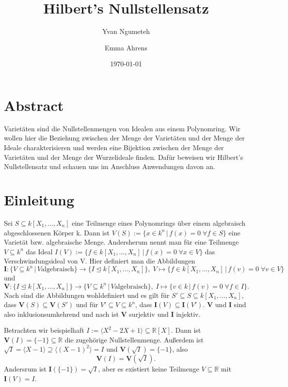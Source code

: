 \documentclass{article}
\title{Hilbert's Nullstellensatz}
\date{\today}
\author{Yvan Ngumeteh \and Emma Ahrens}
\newcommand*{\R}{k[X_{1},\ldots,X_{n}]}
\begin{document}
\maketitle

\section{Abstract}

	Varietäten sind die Nullstellenmengen von Idealen aus einem Polynomring. Wir wollen hier die Beziehung zwischen der Menge der Varietäten und der Menge der Ideale charakterisieren und werden
	eine Bijektion zwischen der Menge der Varietäten und der Menge der Wurzelideale finden. 
	Dafür beweisen wir Hilbert's Nullstellensatz und schauen uns im Anschluss Anwendungen davon an.

\section{Einleitung}

	Sei \(S \subseteq \R\) eine Teilmenge eines Polynomrings über einem algebraisch abgeschlossenen
	Körper k. Dann ist \(V(S) := \{x \in k^n\,|\, f(x)=0\; \forall f \in S\}\) eine Varietät bzw.
	algebraische Menge. Andersherum nennt man für eine Teilmenge \(V \subseteq k^{n}\) das 
	Ideal \(I(V) := \{f \in \R\,|\, f(x)=0\; \forall x\in V\}\) das Verschwindungsideal von V.
	Hier definiert man die Abbildungen
	\begin{displaymath} \mathbf{I}: \{ V \subseteq k^n\,|\, V \text{algebraisch}\} \rightarrow \{ I \unlhd k[X_1, \ldots, X_n]\},\; V \mapsto \{f \in k[X_1, \ldots, X_n]\,|\, f(v) = 0 \; \forall v \in V\} \end{displaymath}
	und \begin{displaymath} \mathbf{V}: \{ I \unlhd k[X_1, \ldots, X_n]\} \rightarrow \{ V \subseteq k^n\,|\, V \text{algebraisch}\},\; I \mapsto \{v \in k\,|\, f(v) = 0 \; \forall f \in I\}. \end{displaymath}
	Nach \cite{Geck} sind die Abbildungen wohldefiniert und es gilt für \(S' \subseteq S \subseteq k[X_1,\ldots,X_n]\), dass \(\mathbf{V}(S) \subseteq \mathbf{V}(S')\) und für \(V' \subseteq V \subseteq k^n\), dass \(\mathbf{I}(V) \subseteq \mathbf{I}(V')\). \(\mathbf{V}\) und \(\mathbf{I}\) sind also inklusionsumkehrend und nach \cite{CLOS} ist \(\mathbf{V}\) surjektiv und \(\mathbf{I}\) injektiv.

	Betrachten wir beispielhaft \(I := \langle X^2 - 2X + 1\rangle \subseteq \mathbb{R}[X]\).
	Dann ist \(\mathbf{V}(I) = \{-1\} \subseteq \mathbb{R}\) die zugehörige Nullstellenmenge.
	Außerdem ist \(\sqrt{I} = \langle X-1\rangle \supseteq \langle (X-1)^2\rangle = I\) und
	\(\mathbf{V}(\sqrt{I}) = \{-1\}\), also
	\begin{displaymath}\mathbf{V}(I) = \mathbf{V}(\sqrt{I}).\end{displaymath}
	Andersrum ist \(\mathbf{I}(\{-1\}) = \sqrt{I}\), aber es existiert keine Teilmenge \(V \subseteq \mathbb{R}\) mit \(\mathbf{I}(V) = I\).
	
\end{document}
